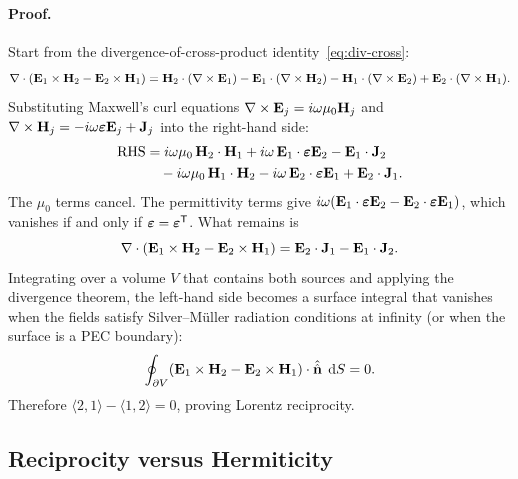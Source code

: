 \paragraph{Proof.}
Start from the divergence-of-cross-product identity~\eqref{eq:div-cross}:
\begin{equation}
 \nabla \cdot (\mathbf{E}_1 \times \mathbf{H}_2 - \mathbf{E}_2 \times \mathbf{H}_1)
 = \mathbf{H}_2 \cdot (\nabla \times \mathbf{E}_1) - \mathbf{E}_1 \cdot (\nabla \times \mathbf{H}_2)
 - \mathbf{H}_1 \cdot (\nabla \times \mathbf{E}_2) + \mathbf{E}_2 \cdot (\nabla \times \mathbf{H}_1).
 \label{eq:reciprocity-divergence}
\end{equation}
Substituting Maxwell's curl equations
$\nabla \times \mathbf{E}_j = i\omega\mu_0\mathbf{H}_j$ and
$\nabla \times \mathbf{H}_j = -i\omega\boldsymbol{\varepsilon}\mathbf{E}_j + \mathbf{J}_j$
into the right-hand side:
\begin{align}
 \text{RHS} &= i\omega\mu_0\,\mathbf{H}_2 \cdot \mathbf{H}_1
 + i\omega\,\mathbf{E}_1 \cdot \boldsymbol{\varepsilon}\mathbf{E}_2
 - \mathbf{E}_1 \cdot \mathbf{J}_2
 \notag\\
 &\quad - i\omega\mu_0\,\mathbf{H}_1 \cdot \mathbf{H}_2
 - i\omega\,\mathbf{E}_2 \cdot \boldsymbol{\varepsilon}\mathbf{E}_1
 + \mathbf{E}_2 \cdot \mathbf{J}_1.
 \label{eq:reciprocity-rhs}
\end{align}
The $\mu_0$ terms cancel. The permittivity terms give
$i\omega(\mathbf{E}_1 \cdot \boldsymbol{\varepsilon}\mathbf{E}_2
- \mathbf{E}_2 \cdot \boldsymbol{\varepsilon}\mathbf{E}_1)$, which vanishes if and
only if $\boldsymbol{\varepsilon} = \boldsymbol{\varepsilon}^{\mathsf{T}}$.
What remains is
\begin{equation}
 \nabla \cdot (\mathbf{E}_1 \times \mathbf{H}_2 - \mathbf{E}_2 \times \mathbf{H}_1)
 = \mathbf{E}_2 \cdot \mathbf{J}_1 - \mathbf{E}_1 \cdot \mathbf{J}_2.
 \label{eq:reciprocity-simplified}
\end{equation}
Integrating over a volume $V$ that contains both sources and applying
the divergence theorem, the left-hand side becomes a surface integral
that vanishes when the fields satisfy Silver--M\"uller radiation
conditions at infinity (or when the surface is a PEC boundary):
\begin{equation}
 \oint_{\partial V} (\mathbf{E}_1 \times \mathbf{H}_2 - \mathbf{E}_2 \times \mathbf{H}_1)
 \cdot \hat{\hat{\mathbf{n}}}\;\mathop{}\!\mathrm{d} S = 0.
 \label{eq:reciprocity-surface}
\end{equation}
Therefore $\langle 2, 1 \rangle - \langle 1, 2 \rangle = 0$, proving
Lorentz reciprocity.

\subsection{Reciprocity versus Hermiticity}
\label{ssec:reciprocity-vs-hermiticity}

